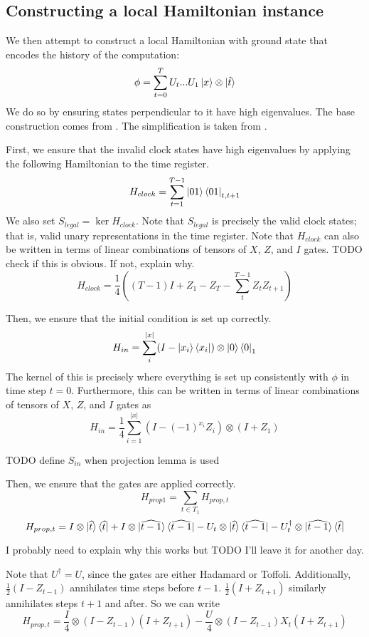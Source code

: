 \subsection{Constructing a local Hamiltonian instance}

We then attempt to construct a local Hamiltonian with ground state that encodes the history of the computation: $$\phi=\sum_{t=0}^TU_t...U_1\ket{x}\otimes\ket{\hat{t}}$$
We do so by ensuring states perpendicular to it have high eigenvalues. The base construction comes from \cite{kitaev2002classical}. The simplification is taken from \cite{biamonte_love_2008}.

First, we ensure that the invalid clock states have high eigenvalues by applying the following Hamiltonian to the time register.
$$H_{clock}=\sum_{t=1}^{T-1}\ket{01}\bra{01}_{t,t+1}$$
We also set $S_{legal}=\ker H_{clock}$. Note that $S_{legal}$ is precisely the valid clock states; that is, valid unary representations in the time register. Note that $H_{clock}$ can also be written in terms of linear combinations of tensors of $X$, $Z$, and $I$ gates. TODO check if this is obvious. If not, explain why.
$$H_{clock}=\frac{1}{4}((T-1)I + Z_1 - Z_T - \sum_t^{T-1}Z_tZ_{t+1})$$

Then, we ensure that the initial condition is set up correctly.
$$H_{in}=\sum_i^{|x|}(I-\ket{x_i}\bra{x_i})\otimes\ket{0}\bra{0}_1$$
The kernel of this is precisely where everything is set up consistently with $\phi$ in time step $t=0$. Furthermore, this can be written in terms of linear combinations of tensors of $X$, $Z$, and $I$ gates as
$$H_{in}=\frac{1}{4}\sum_{i=1}^{|x|}(I-(-1)^{x_i}Z_i)\otimes(I+Z_1)$$

TODO define $S_{in}$ when projection lemma is used

Then, we ensure that the gates are applied correctly.
$$H_{prop1}=\sum_{t\in T_1}H_{prop,t}$$
$$H_{prop,t}=I\otimes\ket{\widehat{t}}\bra{\widehat{t}}
	+I\otimes\ket{\widehat{t-1}}\bra{\widehat{t-1}}
	-U_t\otimes\ket{\widehat{t}}\bra{\widehat{t-1}}
	-U_t^\dagger\otimes\ket{\widehat{t-1}}\bra{\widehat{t}}$$

I probably need to explain why this works but TODO I'll leave it for another day.

Note that $U^\dagger=U$, since the gates are either Hadamard or Toffoli. Additionally, $\frac{1}{2}(I-Z_{t-1})$ annihilates time steps before $t-1$. $\frac{1}{2}(I+Z_{t+1})$ similarly annihilates steps $t+1$ and after.
So we can write
$$H_{prop,t}=\frac{I}{4}\otimes(I-Z_{t-1})(I+Z_{t+1})-\frac{U}{4}\otimes(I-Z_{t-1})X_t(I+Z_{t+1})$$


